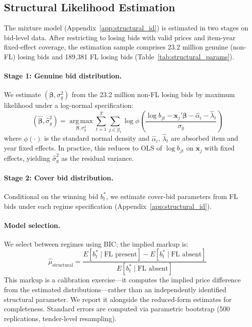 
\subsection{Structural Likelihood Estimation}
\label{sec:structural_estimation}

The mixture model (Appendix~\ref{app:structural_id}) is estimated in two stages on bid-level data. After restricting to losing bids with valid prices and item-year fixed-effect coverage, the estimation sample comprises 23.2 million genuine (non-FL) losing bids and 189,381 FL losing bids (Table~\ref{tab:structural_params}).

\paragraph{Stage 1: Genuine bid distribution.}
We estimate $(\boldsymbol{\beta}, \sigma_g^2)$ from the 23.2 million non-FL losing bids by maximum likelihood under a log-normal specification:
\begin{equation}
  (\hat{\boldsymbol{\beta}}, \hat{\sigma}_g^2) =
  \operatorname*{arg\,max}_{\boldsymbol{\beta}, \sigma_g^2}
  \sum_{t=1}^{T} \sum_{j \in \mathcal{G}_t}
  \log \phi\!\left(
    \frac{\log b_{jt} - \mathbf{x}_j'\boldsymbol{\beta}
    - \hat{\alpha}_i - \hat{\lambda}_t}{\sigma_g}
  \right)
  \label{eq:mle_genuine}
\end{equation}
where $\phi(\cdot)$ is the standard normal density and $\hat{\alpha}_i$, $\hat{\lambda}_t$ are absorbed item and year fixed effects. In practice, this reduces to OLS of $\log b_{jt}$ on $\mathbf{x}_j$ with fixed effects, yielding $\hat{\sigma}_g^2$ as the residual variance.

\paragraph{Stage 2: Cover bid distribution.}
Conditional on the winning bid $b^*_t$, we estimate cover-bid parameters from FL bids under each regime specification (Appendix~\ref{app:structural_id}).

\paragraph{Model selection.}
We select between regimes using BIC; the implied markup is:
\begin{equation}
  \hat{\mu}_{\text{structural}} =
  \frac{E[b^*_t \mid \text{FL present}] -
        E[b^*_t \mid \text{FL absent}]}{E[b^*_t \mid \text{FL absent}]}
  \label{eq:structural_markup}
\end{equation}
This markup is a calibration exercise---it computes the implied price
difference from the estimated distributions---rather than an
independently identified structural parameter. We report it alongside
the reduced-form estimates for completeness. Standard errors are
computed via parametric bootstrap (500 replications, tender-level
resampling).

